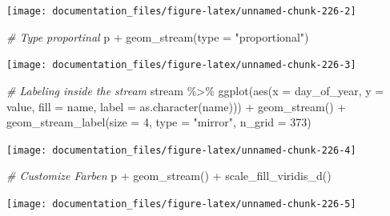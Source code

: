 \documentclass[
]{article}
\newenvironment{Shaded}{\begin{snugshade}}{\end{snugshade}}
\newcommand{\AttributeTok}[1]{\textcolor[rgb]{0.77,0.63,0.00}{#1}}
\newcommand{\CommentTok}[1]{\textcolor[rgb]{0.56,0.35,0.01}{\textit{#1}}}
\newcommand{\DecValTok}[1]{\textcolor[rgb]{0.00,0.00,0.81}{#1}}
\newcommand{\FunctionTok}[1]{\textcolor[rgb]{0.00,0.00,0.00}{#1}}
\newcommand{\NormalTok}[1]{#1}
\newcommand{\SpecialCharTok}[1]{\textcolor[rgb]{0.00,0.00,0.00}{#1}}
\newcommand{\StringTok}[1]{\textcolor[rgb]{0.31,0.60,0.02}{#1}}
\begin{document}
\begin{center}\texttt{[image: documentation\_files/figure-latex/unnamed-chunk-226-2]} \end{center}

\begin{Shaded}
\begin{Highlighting}[]
\CommentTok{\# Type proportinal}
\NormalTok{p }\SpecialCharTok{+} \FunctionTok{geom\_stream}\NormalTok{(}\AttributeTok{type =} \StringTok{"proportional"}\NormalTok{)}
\end{Highlighting}
\end{Shaded}

\begin{center}\texttt{[image: documentation\_files/figure-latex/unnamed-chunk-226-3]} \end{center}

\begin{Shaded}
\begin{Highlighting}[]
\CommentTok{\# Labeling inside the stream}
\NormalTok{stream }\SpecialCharTok{\%\textgreater{}\%}
  \FunctionTok{ggplot}\NormalTok{(}\FunctionTok{aes}\NormalTok{(}\AttributeTok{x =}\NormalTok{ day\_of\_year, }\AttributeTok{y =}\NormalTok{ value, }\AttributeTok{fill =}\NormalTok{ name, }\AttributeTok{label =} \FunctionTok{as.character}\NormalTok{(name))) }\SpecialCharTok{+}
  \FunctionTok{geom\_stream}\NormalTok{() }\SpecialCharTok{+}
  \FunctionTok{geom\_stream\_label}\NormalTok{(}\AttributeTok{size =} \DecValTok{4}\NormalTok{, }\AttributeTok{type =} \StringTok{"mirror"}\NormalTok{, }\AttributeTok{n\_grid =} \DecValTok{373}\NormalTok{)}
\end{Highlighting}
\end{Shaded}

\begin{center}\texttt{[image: documentation\_files/figure-latex/unnamed-chunk-226-4]} \end{center}

\begin{Shaded}
\begin{Highlighting}[]
\CommentTok{\# Customize Farben}
\NormalTok{p }\SpecialCharTok{+} \FunctionTok{geom\_stream}\NormalTok{() }\SpecialCharTok{+}
  \FunctionTok{scale\_fill\_viridis\_d}\NormalTok{()}
\end{Highlighting}
\end{Shaded}

\begin{center}\texttt{[image: documentation\_files/figure-latex/unnamed-chunk-226-5]} \end{center}
\end{document}
